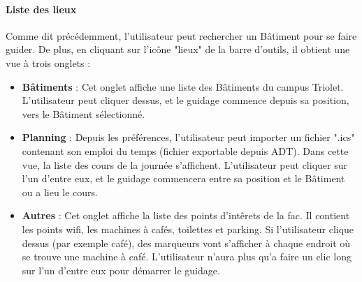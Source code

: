 \documentclass{article}
\begin{document}
	\paragraph{Liste des lieux}
	Comme dit précédemment, l'utilisateur peut rechercher un Bâtiment pour se faire guider. De plus, en cliquant sur l'icône "lieux" de la barre d'outils, il obtient une vue à trois onglets : \\
	\begin{itemize}
		\item \textbf{Bâtiments} : Cet onglet affiche une liste des Bâtiments du campus Triolet. L'utilisateur peut cliquer dessus, et le guidage commence depuis sa position, vers le Bâtiment sélectionné.
		\item \textbf{Planning} : Depuis les préférences, l'utilisateur peut importer un fichier ".ics" contenant son emploi du temps (fichier exportable depuis ADT). Dans cette vue, la liste des cours de la journée s'affichent. L'utilisateur peut cliquer sur l'un d'entre eux, et le guidage commencera entre sa position et le Bâtiment ou a lieu le cours.
		\item \textbf{Autres} : Cet onglet affiche la liste des points d'intêrets de la fac. Il contient les points wifi, les machines à cafés, toilettes et parking.
		Si l'utilisateur clique dessus (par exemple café), des marqueurs vont s'afficher à chaque endroit où se trouve une machine à café. L'utilisateur n'aura plus qu'a faire un clic long sur l'un d'entre eux pour démarrer le guidage.
	\end{itemize}
	
\end{document}
